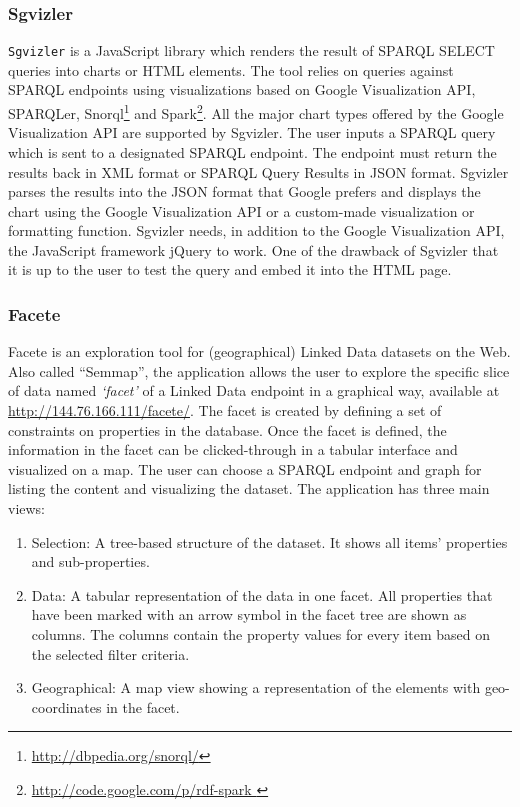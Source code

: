 \subsubsection{Sgvizler}
\texttt{Sgvizler} \cite{Martin2012} is a JavaScript library which renders the result of SPARQL SELECT queries into charts or HTML elements. The tool relies on queries against SPARQL endpoints using visualizations based on Google Visualization API, SPARQLer, Snorql\footnote{\url{http://dbpedia.org/snorql/}} and Spark\footnote{\url{http://code.google.com/p/rdf-spark }}. All the major chart types offered by the Google Visualization API are supported by Sgvizler. The user inputs a SPARQL query which is sent to a designated SPARQL endpoint. The endpoint must return the results back in XML format or SPARQL Query Results in JSON format. Sgvizler parses the results into the JSON format that Google prefers and displays the chart using the Google Visualization API or a custom-made visualization or formatting function. Sgvizler needs, in addition to the Google Visualization API, the JavaScript framework jQuery  to work. One of the drawback of Sgvizler that it is up to the user to test the query and embed it into the HTML page.

\subsubsection{Facete}
Facete \cite{facete:2014} is an exploration tool for (geographical) Linked Data datasets on the Web. Also called ``Semmap'', the application allows the user to explore the specific slice of data named \textit{`facet'}  of a Linked Data endpoint in a graphical way, available at \url{http://144.76.166.111/facete/}. The facet is created by defining a set of constraints on properties in the database. Once the facet is defined, the information in the facet can be clicked-through in a tabular interface and visualized on a map. The user can choose a SPARQL endpoint and graph for listing the content and visualizing the dataset. The application has three main views:
\begin{enumerate}
\item Selection: A tree-based structure of the dataset. It shows all items' properties and sub-properties.
\item  Data: A tabular representation of the data in one facet. All properties that have been marked with an arrow symbol in the facet tree are shown as columns. The columns contain the property values for every item based on the selected filter criteria.
\item Geographical: A map view showing a representation of the elements with geo-coordinates in the facet.
\end{enumerate}

